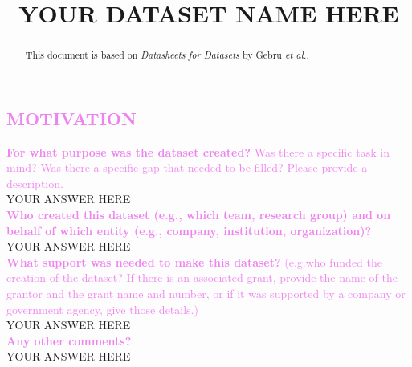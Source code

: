 \documentclass[letterpaper, 10 pt, conference]{ieeeconf}  %
\title{\LARGE \bf
YOUR DATASET NAME HERE
}
\newcommand{\sectioncolor}{violet}
\begin{document}
\maketitle
\thispagestyle{empty}
\pagestyle{empty}


\begin{abstract}

This document is based on \textit{Datasheets for Datasets} by Gebru \textit{et al.}. 

\end{abstract}


\begin{mdframed}[linecolor=\sectioncolor]
\section*{\textcolor{\sectioncolor}{
MOTIVATION
}}
\end{mdframed}
    \textcolor{\sectioncolor}{\textbf{
    For what purpose was the dataset created?
    }
    Was there a specific task in mind? Was there
    a specific gap that needed to be filled? Please provide a description.
    } \\
    YOUR ANSWER HERE \\
    
    \textcolor{\sectioncolor}{\textbf{
    Who created this dataset (e.g., which team, research group) and on behalf of which entity (e.g., company, institution, organization)?
    }
    } \\
    YOUR ANSWER HERE \\
    
    \textcolor{\sectioncolor}{\textbf{
    What support was needed to make this dataset?
    }
    (e.g.who funded the creation of the dataset? If there is an associated grant, provide the name of the grantor and the grant name and number, or if it was supported by a company or government agency, give those details.)
    } \\
    YOUR ANSWER HERE \\
    
    \textcolor{\sectioncolor}{\textbf{
    Any other comments?
    }} \\
    YOUR ANSWER HERE \\
\end{document}
